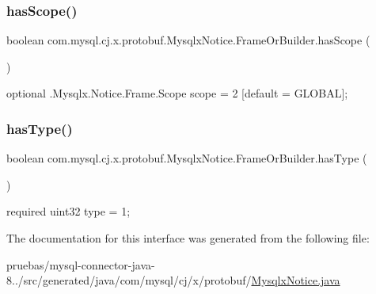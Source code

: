 \subsubsection{\texorpdfstring{has\+Scope()}{hasScope()}}
{\footnotesize\ttfamily boolean com.\+mysql.\+cj.\+x.\+protobuf.\+Mysqlx\+Notice.\+Frame\+Or\+Builder.\+has\+Scope (\begin{DoxyParamCaption}{ }\end{DoxyParamCaption})}

{\ttfamily optional .Mysqlx.\+Notice.\+Frame.\+Scope scope = 2 \mbox{[}default = G\+L\+O\+B\+AL\mbox{]};} \mbox{\label{interfacecom_1_1mysql_1_1cj_1_1x_1_1protobuf_1_1_mysqlx_notice_1_1_frame_or_builder_a7e4eaabcca9c9483a0200a69dab53527}} 
\subsubsection{\texorpdfstring{has\+Type()}{hasType()}}
{\footnotesize\ttfamily boolean com.\+mysql.\+cj.\+x.\+protobuf.\+Mysqlx\+Notice.\+Frame\+Or\+Builder.\+has\+Type (\begin{DoxyParamCaption}{ }\end{DoxyParamCaption})}

{\ttfamily required uint32 type = 1;} 

The documentation for this interface was generated from the following file\+:\begin{DoxyCompactItemize}
\item 
pruebas/mysql-\/connector-\/java-\/8../src/generated/java/com/mysql/cj/x/protobuf/\mbox{\hyperlink{_mysqlx_notice_8java}{Mysqlx\+Notice.\+java}}\end{DoxyCompactItemize}

